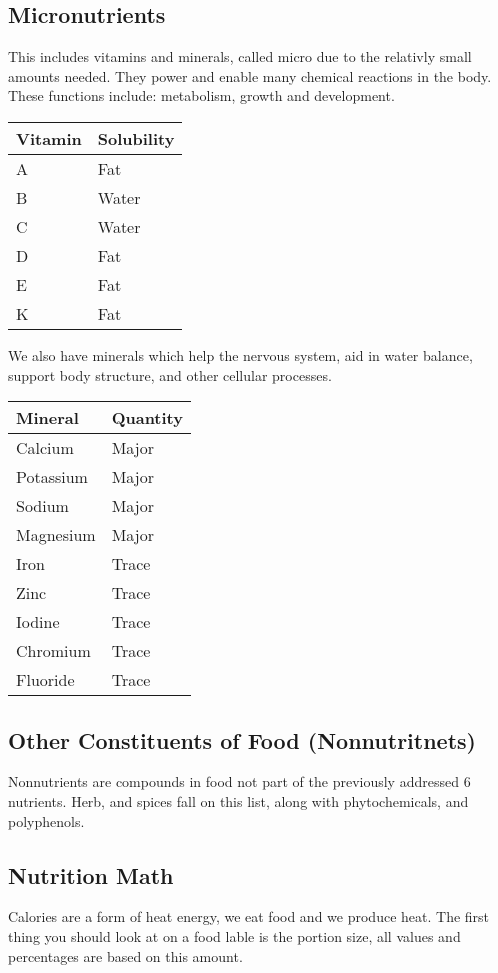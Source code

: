 \documentclass[letterpaper, 11pt]{article}
\begin{document}
\subsection{Micronutrients}
\label{sec:org08244fc}
This includes vitamins and minerals, called micro due to the relativly small amounts needed. They power and enable many chemical reactions in the body. These functions include: metabolism, growth and development.\\
\begin{center}
\begin{tabular}{ll}
Vitamin & Solubility\\
\hline
A & Fat\\
B & Water\\
C & Water\\
D & Fat\\
E & Fat\\
K & Fat\\
\end{tabular}
\end{center}
We also have minerals which help the nervous system, aid in water balance, support body structure, and other cellular processes.\\
\begin{center}
\begin{tabular}{ll}
Mineral & Quantity\\
\hline
Calcium & Major\\
Potassium & Major\\
Sodium & Major\\
Magnesium & Major\\
Iron & Trace\\
Zinc & Trace\\
Iodine & Trace\\
Chromium & Trace\\
Fluoride & Trace\\
\end{tabular}
\end{center}
\subsection{Other Constituents of Food (Nonnutritnets)}
\label{sec:org4d381fa}
Nonnutrients are compounds in food not part of the previously addressed 6 nutrients. Herb, and spices fall on this list, along with phytochemicals, and polyphenols.\\
\subsection{Nutrition Math}
\label{sec:org71ce396}
Calories are a form of heat energy, we eat food and we produce heat. The first thing you should look at on a food lable is the portion size, all values and percentages are based on this amount.\\
\end{document}
